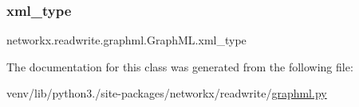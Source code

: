 \subsubsection{\texorpdfstring{xml\+\_\+type}{xml\_type}}
{\footnotesize\ttfamily networkx.\+readwrite.\+graphml.\+Graph\+M\+L.\+xml\+\_\+type}



The documentation for this class was generated from the following file\+:\begin{DoxyCompactItemize}
\item 
venv/lib/python3./site-\/packages/networkx/readwrite/\hyperlink{graphml_8py}{graphml.\+py}\end{DoxyCompactItemize}

